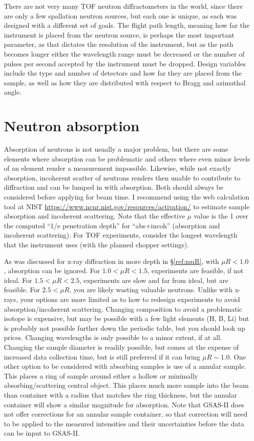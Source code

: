There are not very many TOF neutron diffractometers in the world, since there are only a few spallation neutron sources, but each one is unique, as each was designed with a different set of goals. The flight path length, meaning how far the instrument is placed from the neutron source, is perhaps the most important parameter, as that dictates the resolution of the instrument, but as the path becomes longer either the wavelength range must be decreased or the number of pulses per second accepted by the instrument must be dropped. Design variables include the type and number of detectors and how far they are placed from the sample, as well as how they are distributed with respect to Bragg and azimuthal angle.

\section{Neutron absorption}
Absorption of neutrons is not usually a major problem, but there are some elements where absorption can be problematic and others where even minor levels of an element render a measurement impossible. Likewise, while not exactly absorption, incoherent scatter of neutrons renders then unable to contribute to diffraction and can be lumped in with absorption. Both should always be considered before applying for beam time. I recommend using the web calculation tool at NIST \url{https://www.ncnr.nist.gov/resources/activation/} to estimate sample absorption and incoherent scattering. Note that the effective $\mu$ value is the 1 over the computed ``1/e penetration depth'' for ``abs+incoh'' (absorption and incoherent scattering). For TOF experiments, consider the longest wavelength that the instrument uses (with the planned chopper settings). 

As was discussed for x-ray diffraction in more depth in \S\ref{ref:muR}, with $\mu R < 1.0$, absorption can be ignored. For $1.0 < \mu R < 1.5$, experiments are feasible, if not ideal. For $1.5 < \mu R < 2.5$, experiments are slow and far from ideal, but are feasible. For $2.5 < \mu R$, you are likely wasting valuable neutrons. Unlike with x-rays, your options are more limited as to how to redesign experiments to avoid absorption/incoherent scattering. Changing composition to avoid a problematic isotope is expensive, but may be possible with a few light elements (H, B, Li) but is probably not possible further down the periodic table, but you should look up prices. Changing wavelengths is only possible to a minor extent, if at all. Changing the sample diameter is readily possible, but comes at the expense of increased data collection time, but is still preferred if it can bring $\mu R \sim 1.0$. One other option to be considered with absorbing samples is use of a annular sample. This places a ring of sample around either a hollow or minimally absorbing/scattering central object. This places much more sample into the beam than container with a radius that matches the ring thickness, but the annular container will show a similar magnitude for absorption. Note that GSAS-II does not offer corrections for an annular sample container, so that correction will need to be applied to the measured intensities and their uncertainties before the data can be input to GSAS-II. 

